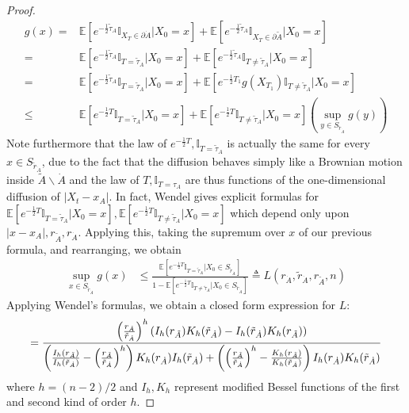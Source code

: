 \documentclass[12pt, nofootinbib,english, amsmath, amssymb, aps, priprint, graphicx,floatfix]{revtex4-1}
\theoremstyle{plain}
\theoremstyle{definition}
\theoremstyle{plain}
\newcommand{\indicatorf}[1]{\mathbb{I}_{#1}}
\begin{document}
\begin{proof}
\begin{align*}
	g(x) = &\mathbb{E}[e^{-\frac{1}{2}\tilde \tau_A}\indicatorf{X_T \in\partial\dot A}|X_0=x]+ \mathbb{E}[e^{-\frac{1}{2}\tilde \tau_A}\indicatorf{X_T \in\partial\tilde A}|X_0=x]\\
	    =  &\mathbb{E}[e^{-\frac{1}{2}\tilde \tau_A}\indicatorf{T=\tilde \tau_A}|X_0=x]+ \mathbb{E}[e^{-\frac{1}{2}\tilde \tau_A}\indicatorf{T\neq\tilde \tau_A}|X_0=x]\\
     = & \mathbb{E}[e^{-\frac{1}{2}\tilde \tau_A}\indicatorf{T=\tilde \tau_A}|X_0=x]+
     \mathbb{E}[e^{-\frac{1}{2}T_1}g(X_{T_1})\indicatorf{T\neq\tilde \tau_A}|X_0=x]\\
     \leq & \mathbb{E}[e^{-\frac{1}{2}T}\indicatorf{T=\tilde \tau_A}|X_0=x]+
                    \mathbb{E}[e^{-\frac{1}{2}T}\indicatorf{T\neq\tilde \tau_A}|X_0=x]\left(\sup_{y\in 
		   S_{\tilde r_{\dot A}}} g(y)\right)
\end{align*}
Note furthermore that the law of $e^{-\frac{1}{2}T},\indicatorf{T=\tilde \tau_A}$ is actually the same for every $x\in S_{\tilde r_{\dot A}}$, due to the fact that the diffusion behaves simply like a Brownian motion inside $\tilde A \backslash \dot A$ and the law of $T,\indicatorf{T=\tau_A}$ are thus functions of the one-dimensional diffusion of $|X_t-x_A|$.  In fact, Wendel\cite{Wendel1980-sj} gives explicit formulas for $\mathbb{E}[e^{-\frac{1}{2}T}\indicatorf{T=\tilde \tau_A}|X_0=x],\mathbb{E}[e^{-\frac{1}{2}T}\indicatorf{T\neq\tilde \tau_A}|X_0=x]$ which depend only upon $|x-x_A|,r_{\tilde{A}},r_{\dot A}$.  Applying this, taking the supremum over $x$ of our previous formula, and rearranging, we obtain
\begin{align*}
\sup_{x\in S_{\tilde r_{\dot A}}} g(x) &\leq \frac{\mathbb{E}[e^{-\frac{1}{2}T}\indicatorf{T=\tilde \tau_A}|X_0\in S_{\tilde r_{\dot A}}]}{1-\mathbb{E}[e^{-\frac{1}{2}T}\indicatorf{T\neq\tilde \tau_A}|X_0\in S_{\tilde r_{\dot A}}]} \triangleq L(r_{\dot A},\tilde r_{\dot A},r_{\tilde A},n)
\end{align*}
Applying Wendel's formulas, we obtain a closed form expression for $L$:
\[
=\frac{\left( \frac{r_{\dot A}}{\tilde r_{\dot A}} \right)^h (I_h (
r_{\tilde{A}}) K_h ( \tilde r_{\dot A}) - I_h ( \tilde r_{\dot A}) K_h (
r_{\tilde{A}}))}{
    \left( \frac{I_h ( r_{\tilde{A}})}{I_h ( \tilde r_{\dot A})} - \left(
\frac{r_{\tilde{A}}}{\tilde r_{\dot A}} \right)^h  \right)
K_h ( r_{\dot A}) I_h ( \tilde r_{\dot A})+ 
    \left( \left( \frac{r_{\tilde{A}}}{\tilde r_{\dot A}}
\right)^h  - \frac{K_h ( r_{\tilde{A}})}{K_h ( \tilde r_{\dot A})} \right) I_h (r_{\dot A})K_h ( \tilde r_{\dot A})}\\
\]
where $h=(n-2)/2$ and $I_h,K_h$ represent modified Bessel functions of the first and second kind of order $h$.  
 

\end{proof}
\end{document}
